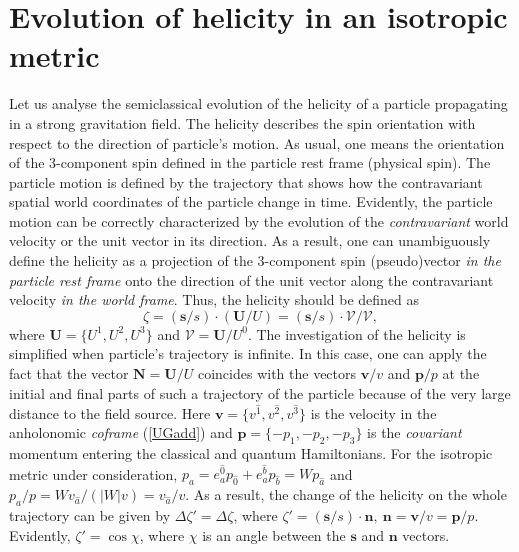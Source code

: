\documentclass[preprint,showpacs,preprintnumbers,eqsecnum,amsmath,amssymb]{revtex4}
\begin{document}
\section{Evolution of helicity in an isotropic metric}\label{H}


Let us analyse the semiclassical evolution of the helicity of a
particle propagating in a strong gravitation field. The helicity
describes the spin orientation with respect to the direction of
particle's motion. As usual, one means the orientation of the
3-component spin defined in the particle rest frame (physical
spin). The particle motion is defined by the trajectory that shows
how the contravariant spatial world coordinates of the particle
change in time. Evidently, the particle motion can be correctly
characterized by the evolution of the \emph{contravariant} world
velocity or the unit vector in its direction. As a result, one can
unambiguously define the helicity as a projection of the
3-component spin (pseudo)vector \emph{in the particle rest frame}
onto the direction of the unit vector along the contravariant
velocity \emph{in the world frame}. Thus, the helicity should be defined as
$$\zeta= (\bm s/s)\cdot(\bm U/U)=(\bm s/s)\cdot\bm{\mathcal{V}}/\mathcal{V},$$
where $\bm U=\{U^1,U^2,U^3\}$ and $\bm{\mathcal{V}}=\bm U/U^0$.
The investigation of the helicity is simplified when particle's
trajectory is infinite. In this case, one can apply the fact that
the vector $\bm N=\bm U/U$ coincides with the vectors ${\bm v}/v$
and ${\bm p}/p$ at the initial and final parts of such a
trajectory of the particle because of the very large distance to
the field source. Here $\bm
v=\{v^{\widehat{1}},v^{\widehat{2}},v^{\widehat{3}}\}$ is the
velocity in the anholonomic \emph{coframe} (\ref{UGadd}) and $\bm
p =\{-p_1,-p_2,-p_3\}$ is the \emph{covariant} momentum entering
the classical and quantum Hamiltonians. For the isotropic metric
under consideration,
$p_a=e_a^{\widehat{0}}p_{\widehat{0}}+e_a^{\widehat{b}}p_{\widehat{b}}=
Wp_{\widehat{a}}$ and
$p_a/p=Wv_{\widehat{a}}/(|W|v)=v_{\widehat{a}}/v$. As a result,
the change of the helicity on the whole trajectory can be given by
$\Delta\zeta'=\Delta\zeta$, where $\zeta'= (\bm s/s)\cdot\bm
n,~{\bm n} = {\bm v}/v={\bm p}/p$. Evidently, $\zeta'=\cos{\chi}$,
where $\chi$ is an angle between the $\bm s$ and $\bm n$ vectors.
\end{document}
